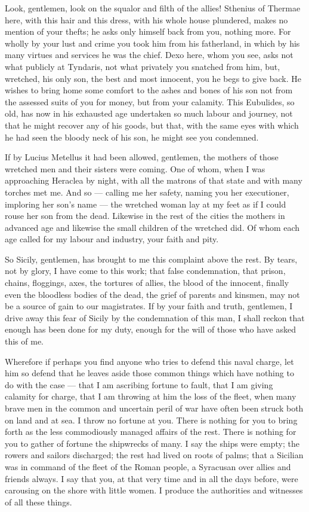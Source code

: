  Look, gentlemen, look on the squalor and filth of the allies! Sthenius of Thermae here, with this hair and this dress, with his whole house plundered, makes no mention of your thefts; he asks only himself back from you, nothing more. For wholly by your lust and crime you took him from his fatherland, in which by his many virtues and services he was the chief. Dexo here, whom you see, asks not what publicly at Tyndaris, not what privately you snatched from him, but, wretched, his only son, the best and most innocent, you he begs to give back. He wishes to bring home some comfort to the ashes and bones of his son not from the assessed suits of you for money, but from your calamity. This Eubulides, so old, has now in his exhausted age undertaken so much labour and journey, not that he might recover any of his goods, but that, with the same eyes with which he had seen the bloody neck of his son, he might see you condemned.

 If by Lucius Metellus it had been allowed, gentlemen, the mothers of those wretched men and their sisters were coming. One of whom, when I was approaching Heraclea by night, with all the matrons of that state and with many torches met me. And so --- calling me her safety, naming you her executioner, imploring her son's name --- the wretched woman lay at my feet as if I could rouse her son from the dead. Likewise in the rest of the cities the mothers in advanced age and likewise the small children of the wretched did. Of whom each age called for my labour and industry, your faith and pity.

 So Sicily, gentlemen, has brought to me this complaint above the rest. By tears, not by glory, I have come to this work; that false condemnation, that prison, chains, floggings, axes, the tortures of allies, the blood of the innocent, finally even the bloodless bodies of the dead, the grief of parents and kinsmen, may not be a source of gain to our magistrates. If by your faith and truth, gentlemen, I drive away this fear of Sicily by the condemnation of this man, I shall reckon that enough has been done for my duty, enough for the will of those who have asked this of me.

 Wherefore if perhaps you find anyone who tries to defend this naval charge, let him so defend that he leaves aside those common things which have nothing to do with the case --- that I am ascribing fortune to fault, that I am giving calamity for charge, that I am throwing at him the loss of the fleet, when many brave men in the common and uncertain peril of war have often been struck both on land and at sea. I throw no fortune at you. There is nothing for you to bring forth as the less commodiously managed affairs of the rest. There is nothing for you to gather of fortune the shipwrecks of many. I say the ships were empty; the rowers and sailors discharged; the rest had lived on roots of palms; that a Sicilian was in command of the fleet of the Roman people, a Syracusan over allies and friends always. I say that you, at that very time and in all the days before, were carousing on the shore with little women. I produce the authorities and witnesses of all these things.

